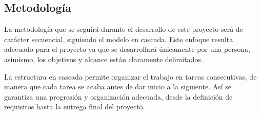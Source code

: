 \subsection{Metodología}
La metodología que se seguirá durante el desarrollo de este proyecto será de carácter secuencial, 
siguiendo el modelo en cascada. Este enfoque resulta adecuado para el proyecto ya que se desarrollará 
únicamente por una persona, asimismo, los objetivos y alcance están claramente delimitados.

La estructura en cascada permite organizar el trabajo en tareas consecutivas, de manera que cada 
tarea se acaba antes de dar inicio a la siguiente. Así se garantiza una progresión y organización adecuada, 
desde la definición de requisitos hasta la entrega final del proyecto.
